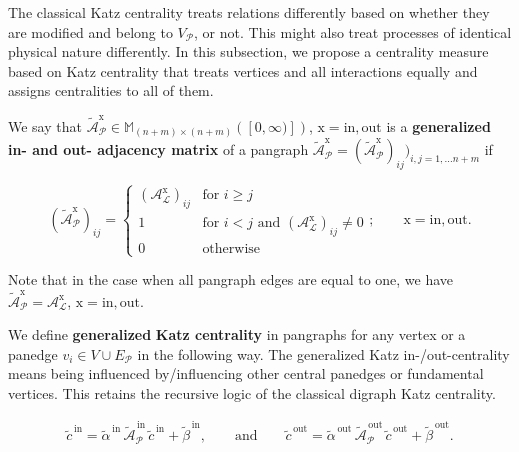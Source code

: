 \documentclass[a4paper,12pt]{article}
\theoremstyle{definition}
\theoremstyle{remark}
\newcommand{\mP}{\mathcal{P}}
\newcommand{\mL}{\mathcal{L}}
\newcommand{\EP}{E_{\mathcal{P}}}
\newcommand{\tin}{\mathrm{in}}
\newcommand{\out}{\mathrm{out}}
\begin{document}
The classical Katz centrality treats relations differently based on whether they are modified and belong to $V_{\mP}$, or not. This might also treat processes of identical physical nature differently. In this subsection, we propose a centrality measure based on Katz centrality that treats vertices and all interactions equally and assigns centralities to all of them.

 We say that $\tilde{\mathcal{A}}_{\mP}^{\mathrm{x}} \in \mathbb{M}_{(n+m) \times (n+m)}([0,\infty)])$, $\mathrm{x}=\tin, \out$ is a \textbf{generalized in- and out- adjacency matrix} of a pangraph $\tilde{\mathcal{A}}_{\mP}^{\mathrm{x}}=(\tilde{\mathcal{A}}_{\mP}^{\mathrm{x}})_{ij})_{i,j=1,\ldots n+m}$ if

\begin{equation}\label{eq:def_gen_adj}
(\tilde{\mathcal{A}}_{\mP}^{\mathrm{x}})_{ij}=\left\{\begin{array}{cl}
(\mathcal{A}_{\mL}^{\mathrm{x}})_{ij}&\textrm{for } i\geq j\\
1&\textrm{for } i< j\textrm{ and } (\mathcal{A}_{\mL}^{\mathrm{x}})_{ij}\neq 0\\
0&\textrm{otherwise}
\end{array}\right.;\qquad
\textrm{x}=\tin,\out.
\end{equation}

Note that in the case when all pangraph edges are equal to one, we have $\tilde{\mathcal{A}}_{\mP}^{\mathrm{x}}=\mathcal{A}_{\mL}^{\mathrm{x}}$, $\textrm{x}=\tin,\out$.

We define \textbf{generalized} \textbf{Katz centrality} in pangraphs for any vertex or a panedge $v_i\in V\cup \EP$ in the following way. The generalized Katz in-/out-centrality means being influenced by/influencing other central panedges or fundamental vertices. This retains the recursive logic of the classical digraph Katz centrality.

\begin{align}\label{eq:Katz_from_Levi}
    \tilde{c}^{\,\tin}=\tilde{\alpha}^{\,\tin} \, \tilde{\mathcal{A}}^{\,\tin}_{\mP}\, \tilde{c}^{\,\tin} + \tilde{\beta}^{\,\tin}, \qquad \textrm{and}\qquad
    \tilde{c}^{\,\out}=\tilde{\alpha}^{\,\out}  \,\tilde{\mathcal{A}}^{\,\out}_{\mP}\, \tilde{c}^{\,\out} + \tilde{\beta}^{\,\out}.
\end{align}
\end{document}
